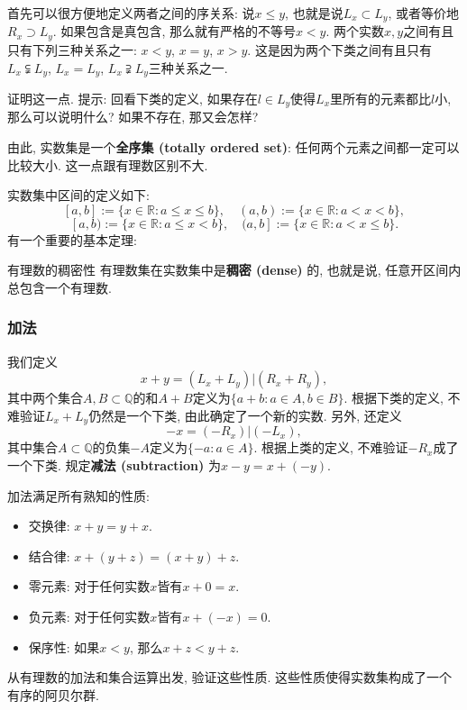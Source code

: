 首先可以很方便地定义两者之间的序关系: 说$x\leq y$, 也就是说$L_x\subset L_y$, 或者等价地$R_x\supset L_y$. 如果包含是真包含, 那么就有严格的不等号$x<y$. 两个实数$x,y$之间有且只有下列三种关系之一: $x<y$, $x=y$, $x>y$. 这是因为两个下类之间有且只有$L_x\subsetneqq L_y$, $L_x=L_y$, $L_x\supsetneqq L_y$三种关系之一.

\begin{exercise}{}
证明这一点. 提示: 回看下类的定义, 如果存在$l\in L_y$使得$L_x$里所有的元素都比$l$小, 那么可以说明什么? 如果不存在, 那又会怎样?
\end{exercise}

由此, 实数集是一个\textbf{全序集 (totally ordered set)}: 任何两个元素之间都一定可以比较大小. 这一点跟有理数区别不大.

实数集中区间的定义如下: 
$$
[a,b]:=\{x\in\mathbb{R}:a\leq x\leq b\},
\quad
(a,b):=\{x\in\mathbb{R}:a< x< b\},
$$
$$
[a,b):=\{x\in\mathbb{R}:a\leq x< b\},
\quad
(a,b]:=\{x\in\mathbb{R}:a< x\leq b\}.
$$
有一个重要的基本定理:
\begin{theorem}{有理数的稠密性}
有理数集在实数集中是\textbf{稠密 (dense)} 的, 也就是说, 任意开区间内总包含一个有理数.
\end{theorem}


\subsubsection{加法}

我们定义
$$
x+y=(L_x+L_y)|(R_x+R_y),
$$
其中两个集合$A,B\subset\mathbb{Q}$的和$A+B$定义为$\{a+b:a\in A, b\in B\}$. 根据下类的定义, 不难验证$L_x+L_y$仍然是一个下类, 由此确定了一个新的实数. 另外, 还定义
$$
-x=(-R_x)|(-L_x),
$$
其中集合$A\subset\mathbb{Q}$的负集$-A$定义为$\{-a:a\in A\}$. 根据上类的定义, 不难验证$-R_x$成了一个下类. 规定\textbf{减法 (subtraction)} 为$x-y=x+(-y)$.

加法满足所有熟知的性质:

\begin{itemize}
\item 交换律: $x+y=y+x$.
\item 结合律: $x+(y+z)=(x+y)+z$.
\item 零元素: 对于任何实数$x$皆有$x+0=x$.
\item 负元素: 对于任何实数$x$皆有$x+(-x)=0$.
\item 保序性: 如果$x<y$, 那么$x+z<y+z$.
\end{itemize}

\begin{exercise}{}
从有理数的加法和集合运算出发, 验证这些性质. 这些性质使得实数集构成了一个有序的阿贝尔群.
\end{exercise}

